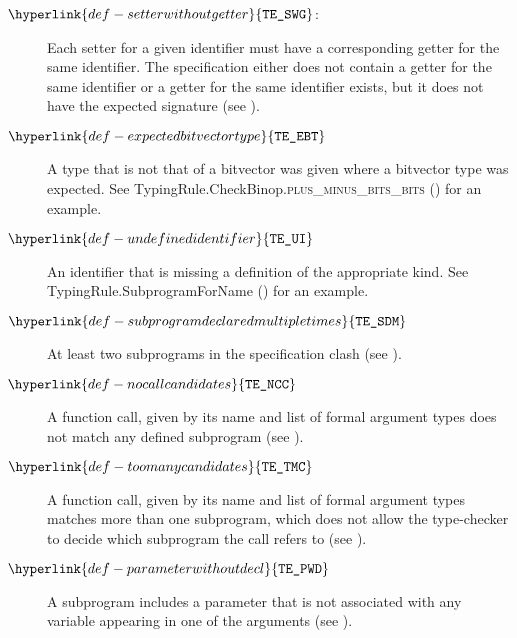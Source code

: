 \documentclass{book}
\newcommand\typingrulecasename[2]{TypingRule.{#1}.\textsc{#2}}
\newcommand\TypeErrorCode[1]{\texttt{TE\_#1}}
\newcommand\UndefinedIdentifier[0]{\hyperlink{def-undefinedidentifier}{\TypeErrorCode{UI}}}
\newcommand\SetterWithoutGetter[0]{\hyperlink{def-setterwithoutgetter}{\TypeErrorCode{SWG}}}
\newcommand\ExpectedBitvectorType[0]{\hyperlink{def-expectedbitvectortype}{\TypeErrorCode{EBT}}}
\newcommand\SubrogramDeclaredMultipleTimes[0]{\hyperlink{def-subprogramdeclaredmultipletimes}{\TypeErrorCode{SDM}}}
\newcommand\NoCallCandidates[0]{\hyperlink{def-nocallcandidates}{\TypeErrorCode{NCC}}}
\newcommand\TooManyCandidates[0]{\hyperlink{def-toomanycandidates}{\TypeErrorCode{TMC}}}
\newcommand\ParameterWithoutDecl[0]{\hyperlink{def-parameterwithoutdecl}{\TypeErrorCode{PWD}}}
\begin{document}
\begin{description}
\hypertarget{def-setterwithoutgetter}{}
\item[$\SetterWithoutGetter$:]
Each setter for a given identifier must have a corresponding getter for the same
identifier.
The specification either does not contain a getter for the same identifier
or a getter for the same identifier exists, but it does not have the expected
signature (see ).

\hypertarget{def-expectedbitvectortype}{}
\item[$\ExpectedBitvectorType$]
A type that is not that of a bitvector was given where a bitvector type was expected.
See \typingrulecasename{CheckBinop}{plus\_minus\_bits\_bits} () for an example.

\hypertarget{def-undefinedidentifier}{}
\item[$\UndefinedIdentifier$]
An identifier that is missing a definition of the appropriate kind.
See TypingRule.SubprogramForName () for an example.

\hypertarget{def-subprogramdeclaredmultipletimes}{}
\item[$\SubrogramDeclaredMultipleTimes$]
At least two subprograms in the specification clash (see ).

\hypertarget{def-nocallcandidates}{}
\item[$\NoCallCandidates$]
A function call, given by its name and list of formal argument types does not match any defined subprogram
(see ).

\hypertarget{def-toomanycandidates}{}
\item[$\TooManyCandidates$]
A function call, given by its name and list of formal argument types matches more than one subprogram,
which does not allow the type-checker to decide which subprogram the call refers to
(see ).

\hypertarget{def-parameterwithoutdecl}{}
\item[$\ParameterWithoutDecl$]
A subprogram includes a parameter that is not associated with any variable appearing in one of the arguments
(see ).
\end{description}



\end{document}
